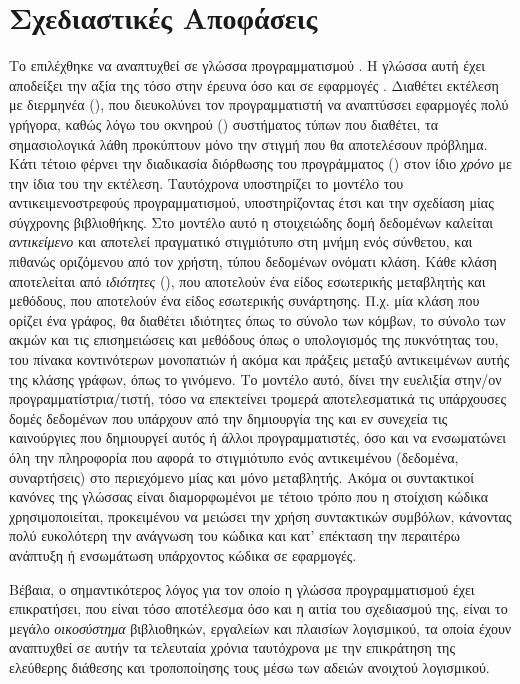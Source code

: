 \section{Σχεδιαστικές Αποφάσεις}
Το  επιλέχθηκε να αναπτυχθεί σε γλώσσα προγραμματισμού .
Η γλώσσα αυτή έχει αποδείξει την αξία της τόσο στην έρευνα όσο και σε εφαρμογές \cite{PythonHype}.
Διαθέτει εκτέλεση με διερμηνέα (), που διευκολύνει τον προγραμματιστή να αναπτύσσει εφαρμογές πολύ γρήγορα, καθώς λόγω του οκνηρού () συστήματος τύπων που διαθέτει, τα σημασιολογικά λάθη προκύπτουν μόνο την στιγμή που θα αποτελέσουν πρόβλημα.
Κάτι τέτοιο φέρνει την διαδικασία διόρθωσης του προγράμματος () στον ίδιο \textit{χρόνο} με την ίδια του την εκτέλεση.
Ταυτόχρονα υποστηρίζει το μοντέλο του αντικειμενοστρεφούς προγραμματισμού, υποστηρίζοντας έτσι και την σχεδίαση μίας σύγχρονης βιβλιοθήκης.
Στο μοντέλο αυτό η στοιχειώδης δομή δεδομένων καλείται \textit{αντικείμενο} και αποτελεί πραγματικό στιγμιότυπο στη μνήμη ενός σύνθετου, και πιθανώς οριζόμενου από τον χρήστη, τύπου δεδομένων ονόματι κλάση.
Κάθε κλάση αποτελείται από  \textit{ιδιότητες} (), που αποτελούν ένα είδος εσωτερικής μεταβλητής και μεθόδους, που αποτελούν ένα είδος εσωτερικής συνάρτησης.
Π.χ. μία κλάση που ορίζει ένα γράφος, θα διαθέτει ιδιότητες όπως το σύνολο των κόμβων, το σύνολο των ακμών και τις επισημειώσεις και μεθόδους όπως ο υπολογισμός της πυκνότητας του, του πίνακα κοντινότερων μονοπατιών ή ακόμα και πράξεις μεταξύ αντικειμένων αυτής της κλάσης γράφων, όπως το γινόμενο.
Το μοντέλο αυτό, δίνει την ευελιξία στην/ον προγραμματίστρια/τιστή, τόσο να επεκτείνει τρομερά αποτελεσματικά τις υπάρχουσες δομές δεδομένων που υπάρχουν από την δημιουργία της και εν συνεχεία τις καινούργιες που δημιουργεί αυτός ή άλλοι προγραμματιστές, όσο και να ενσωματώνει όλη την πληροφορία που αφορά το στιγμιότυπο ενός αντικειμένου (δεδομένα, συναρτήσεις) στο περιεχόμενο μίας και μόνο μεταβλητής.
Ακόμα οι συντακτικοί κανόνες της γλώσσας είναι διαμορφωμένοι με τέτοιο τρόπο που η στοίχιση κώδικα χρησιμοποιείται, προκειμένου να μειώσει την χρήση συντακτικών συμβόλων, κάνοντας πολύ ευκολότερη την ανάγνωση του κώδικα και κατ' επέκταση την περαιτέρω ανάπτυξη ή ενσωμάτωση υπάρχοντος κώδικα σε εφαρμογές.\par
Bέβαια, ο σημαντικότερος λόγος για τον οποίο η γλώσσα προγραμματισμού  έχει επικρατήσει, που είναι τόσο αποτέλεσμα όσο και η αιτία του σχεδιασμού της, είναι το μεγάλο \textit{οικοσύστημα} βιβλιοθηκών, εργαλείων και πλαισίων λογισμικού, τα οποία έχουν αναπτυχθεί σε αυτήν τα τελευταία χρόνια ταυτόχρονα με την επικράτηση της ελεύθερης διάθεσης και τροποποίησης τους μέσω των αδειών ανοιχτού λογισμικού.
